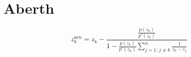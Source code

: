 \documentclass{article}
\begin{document}
\section{Aberth}
\[
z_k^{\text{neu}} =  z_k - \frac{\frac{p(z_k)}{p'(z_k)}}{  1 - \frac{p(z_k)}{p'(z_k)} \sum_{j=1;\,j \neq k}^n \frac{1}{z_k - z_j} }
\]
\end{document}
